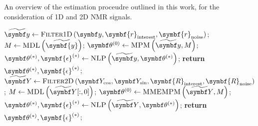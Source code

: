 \begin{algorithm}
    \begin{algorithmic}[1]
        \caption{
            An overview of the estimation proceudre outlined in this work, for
            the consideration of \ac{1D} and \ac{2D} \ac{NMR} signals.
        }
            \State $\widetilde{\by} \gets \textsc{Filter}1\textsc{D}\left(
                \by,
                \symbf{r}_{\text{interest}},
                \symbf{r}_{\text{noise}}
                \right)
            $;
                \State $M \gets \textsc{MDL}\left(\widetilde{\symbf{y}}\right)$;
            \EndIf
            \State $\bthzero \gets \textsc{MPM}\left(\widetilde{\by}, M\right)$;
            \State $\bthstar, \symbf{\epsilon}^{(*)} \gets \textsc{NLP}\left(\widetilde{\by}, \bthstar\right)$;
            \State \textbf{return} $\bthstar, \symbf{\epsilon}^{(*)}$;
        \EndProcedure
        \Statex
            \State $\widetilde{\bY} \gets \textsc{Filter}2\textsc{D}\left(
                \bY_{\cos},
                \bY_{\sin},
                \symbf{R}_{\text{interest}},
                \symbf{R}_{\text{noise}}
                \right)
            $;
                \State $M \gets \textsc{MDL}\left(\widetilde{\bY}[:, 0]\right)$;
            \EndIf
            \State $\bthzero \gets \textsc{MMEMPM}\left(\widetilde{\bY}, M\right)$;
            \State $\bthstar, \symbf{\epsilon}^{(*)} \gets \textsc{NLP}\left(\widetilde{\bY}, \bthstar\right)$;
            \State \textbf{return} $\bthstar, \symbf{\epsilon}^{(*)}$;
        \EndProcedure
    \end{algorithmic}
\end{algorithm}
